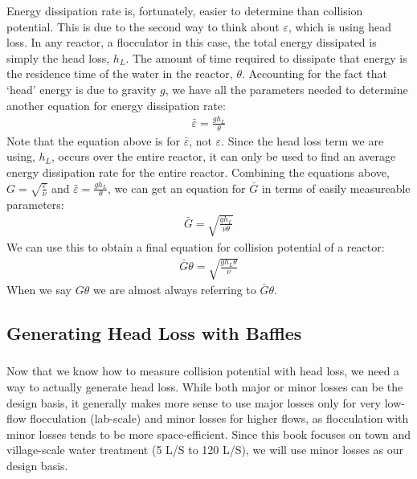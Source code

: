 \documentclass[letterpaper,10pt,english]{sphinxmanual}
\begin{document}
Energy dissipation rate is, fortunately, easier to determine than collision potential. This is due to the second way to think about \(\varepsilon\), which is using head loss. In any reactor, a flocculator in this case, the total energy dissipated is simply the head loss, \(h_L\). The amount of time required to dissipate that energy is the residence time of the water in the reactor, \(\theta\). Accounting for the fact that ‘head’ energy is due to gravity \(g\), we have all the parameters needed to determine another equation for energy dissipation rate:
\begin{equation}\label{equation:Flocculation/Floc_Design:Flocculation/Floc_Design:4}
\begin{split}\bar \varepsilon = \frac{g h_L}{\theta}\end{split}
\end{equation}
Note that the equation above is for \(\bar \varepsilon\), not \(\varepsilon\). Since the head loss term we are using, \(h_L\), occurs over the entire reactor, it can only be used to find an average energy dissipation rate for the entire reactor. Combining the equations above, \(G = \sqrt{\frac{\varepsilon}{\nu}}\) and \(\bar \varepsilon = \frac{g h_L}{\theta}\), we can get an equation for \(\bar G\) in terms of easily measureable parameters:
\begin{equation}\label{equation:Flocculation/Floc_Design:Flocculation/Floc_Design:5}
\begin{split}\bar G = \sqrt{\frac{g h_L}{\nu \theta}}\end{split}
\end{equation}
We can use this to obtain a final equation for collision potential of a reactor:
\begin{equation}\label{equation:Flocculation/Floc_Design:Flocculation/Floc_Design:6}
\begin{split}\bar G \theta = \sqrt{\frac{g h_L \theta}{\nu}}\end{split}
\end{equation}
 When we say \(G \theta\) we are almost always referring to \(\bar G \theta\).


\subsection{Generating Head Loss with Baffles}
\label{\detokenize{Flocculation/Floc_Design:generating-head-loss-with-baffles}}

\subsubsection{}
\label{\detokenize{Flocculation/Floc_Design:what-are-baffles}}
Now that we know how to measure collision potential with head loss, we need a way to actually generate head loss. While both major or minor losses can be the design basis, it generally makes more sense to use major losses only for very low-flow flocculation (lab-scale) and minor losses for higher flows, as flocculation with minor losses tends to be more space-efficient. Since this book focuses on town and village-scale water treatment (5 L/S to 120 L/S), we will use minor losses as our design basis.
\end{document}
